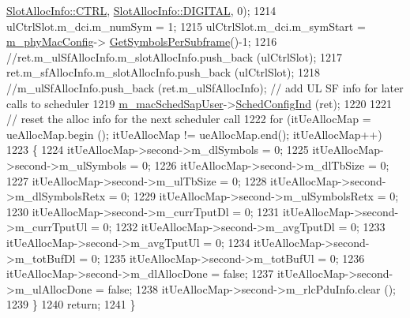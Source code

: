\begin{DoxyCode}
      \hyperlink{structns3_1_1SlotAllocInfo_a3ea7cb503bfd0c9a4df55a71b81b9331ad78b7d76ef82d56c33be1fa9c1867409}{SlotAllocInfo::CTRL}, \hyperlink{structns3_1_1SlotAllocInfo_adcbd067d82be6260b3399167d8f0b4eca47a67c342db658a08ded9ce4b49417ea}{SlotAllocInfo::DIGITAL}, 0);
1214                 ulCtrlSlot.m\_dci.m\_numSym = 1;
1215                 ulCtrlSlot.m\_dci.m\_symStart = \hyperlink{classns3_1_1MmWaveMacScheduler_a24d7af4971d2e500fe543cefbafa2fd9}{m\_phyMacConfig}->
      \hyperlink{classns3_1_1MmWavePhyMacCommon_a2fe835b76e3c689defa413e395cd10cb}{GetSymbolsPerSubframe}()-1;
1216                 \textcolor{comment}{//ret.m\_ulSfAllocInfo.m\_slotAllocInfo.push\_back (ulCtrlSlot);}
1217                 ret.m\_sfAllocInfo.m\_slotAllocInfo.push\_back (ulCtrlSlot);
1218                 \textcolor{comment}{//m\_ulSfAllocInfo.push\_back (ret.m\_ulSfAllocInfo); // add UL SF info for later calls to
       scheduler}
1219                 \hyperlink{classns3_1_1MmWaveFlexTtiMaxRateMacScheduler_a5cbf24eeaf560ea4a132bf967e80f817}{m\_macSchedSapUser}->\hyperlink{classns3_1_1MmWaveMacSchedSapUser_ac164dd52215c3924cf421b56089eece4}{SchedConfigInd} (ret);
1220 
1221                 \textcolor{comment}{// reset the alloc info for the next scheduler call}
1222                 \textcolor{keywordflow}{for} (itUeAllocMap = ueAllocMap.begin (); itUeAllocMap != ueAllocMap.end(); itUeAllocMap++)
1223                 \{
1224                         itUeAllocMap->second->m\_dlSymbols = 0;
1225                         itUeAllocMap->second->m\_ulSymbols = 0;
1226                         itUeAllocMap->second->m\_dlTbSize = 0;
1227                         itUeAllocMap->second->m\_ulTbSize = 0;
1228                         itUeAllocMap->second->m\_dlSymbolsRetx = 0;
1229                         itUeAllocMap->second->m\_ulSymbolsRetx = 0;
1230                         itUeAllocMap->second->m\_currTputDl = 0;
1231                         itUeAllocMap->second->m\_currTputUl = 0;
1232                         itUeAllocMap->second->m\_avgTputDl = 0;
1233                         itUeAllocMap->second->m\_avgTputUl = 0;
1234                         itUeAllocMap->second->m\_totBufDl = 0;
1235                         itUeAllocMap->second->m\_totBufUl = 0;
1236                         itUeAllocMap->second->m\_dlAllocDone = \textcolor{keyword}{false};
1237                         itUeAllocMap->second->m\_ulAllocDone = \textcolor{keyword}{false};
1238                         itUeAllocMap->second->m\_rlcPduInfo.clear ();
1239                 \}
1240                 \textcolor{keywordflow}{return};
1241         \}

\end{DoxyCode}
